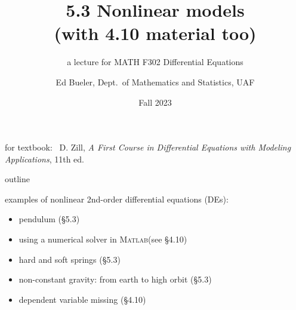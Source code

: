 \documentclass[dvipsnames,colorlinks]{beamer}
\title{5.3 Nonlinear models \\ (with 4.10 material too)}
\subtitle{a lecture for MATH F302 Differential Equations}
\author{Ed Bueler, Dept.~of Mathematics and Statistics, UAF}
\date{Fall 2023}
\newcommand{\Matlab}{\textsc{Matlab}}
\begin{document}


\begin{frame}
\titlepage

\centerline{\tiny for textbook: \, D. Zill, \emph{A First Course in Differential Equations with Modeling Applications}, 11th ed.}
\end{frame}


\begin{frame}{outline}

examples of nonlinear 2nd-order differential equations (DEs):

\begin{itemize}
\item pendulum (\S 5.3)
\item using a numerical solver in \Matlab (see \S4.10)
\item hard and soft springs (\S 5.3)
\item non-constant gravity: from earth to high orbit (\S 5.3)
\item dependent variable missing (\S 4.10)
\end{itemize}
\end{frame}
\end{document}

